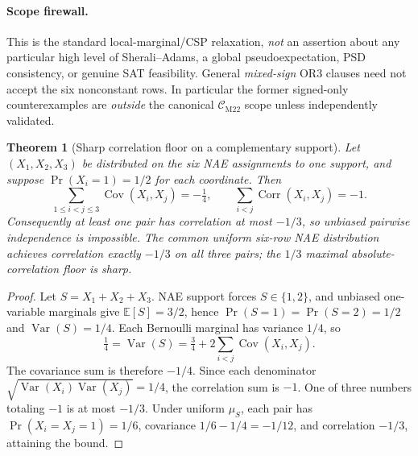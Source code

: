 \documentclass[11pt]{article}
\newtheorem{theorem}{Theorem}
\newcommand{\CM}{\mathcal C_{\mathrm{M22}}}
\begin{document}
\paragraph{Scope firewall.} This is the standard local-marginal/CSP relaxation, \emph{not} an assertion about any particular high level of Sherali--Adams, a global pseudoexpectation, PSD consistency, or genuine SAT feasibility. General \emph{mixed-sign} OR3 clauses need not accept the six nonconstant rows. In particular the former signed-only counterexamples are \emph{outside} the canonical $\CM$ scope unless independently validated.

\begin{theorem}[Sharp correlation floor on a complementary support]
Let $(X_1,X_2,X_3)$ be distributed on the six NAE assignments to one support, and suppose $\Pr(X_i=1)=1/2$ for each coordinate. Then
\[
 \sum_{1\le i<j\le3}\operatorname{Cov}(X_i,X_j)=-\tfrac14,
 \qquad
 \sum_{i<j}\operatorname{Corr}(X_i,X_j)=-1.
\]
Consequently at least one pair has correlation at most $-1/3$, so unbiased pairwise independence is impossible. The common uniform six-row NAE distribution achieves correlation exactly $-1/3$ on \emph{all} three pairs; the $1/3$ maximal absolute-correlation floor is sharp.
\end{theorem}
\begin{proof}
Let $S=X_1+X_2+X_3$. NAE support forces $S\in\{1,2\}$, and unbiased one-variable marginals give $\mathbb E[S]=3/2$, hence $\Pr(S=1)=\Pr(S=2)=1/2$ and $\operatorname{Var}(S)=1/4$. Each Bernoulli marginal has variance $1/4$, so
\[
 \tfrac14=\operatorname{Var}(S)
 =\tfrac34+2\sum_{i<j}\operatorname{Cov}(X_i,X_j).
\]
The covariance sum is therefore $-1/4$. Since each denominator $\sqrt{\operatorname{Var}(X_i)\operatorname{Var}(X_j)}=1/4$, the correlation sum is $-1$. One of three numbers totaling $-1$ is at most $-1/3$. Under uniform $\mu_S$, each pair has $\Pr(X_i=X_j=1)=1/6$, covariance $1/6-1/4=-1/12$, and correlation $-1/3$, attaining the bound.
\end{proof}
\end{document}
